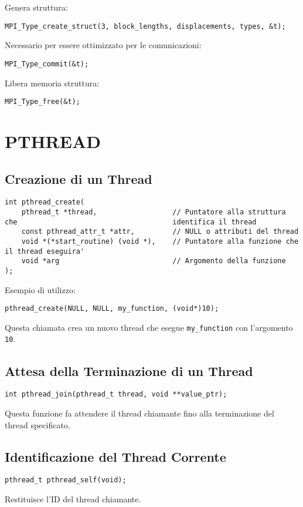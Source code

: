 \documentclass[a4paper,12pt]{article}
\begin{document}
Genera struttura:
\begin{verbatim}
MPI_Type_create_struct(3, block_lengths, displacements, types, &t);
\end{verbatim}

Necessario per essere ottimizzato per le comunicazioni:
\begin{verbatim}
MPI_Type_commit(&t);
\end{verbatim}

Libera memoria struttura:
\begin{verbatim}
MPI_Type_free(&t);
\end{verbatim}

\section{PTHREAD}

\subsection{Creazione di un Thread}
\begin{lstlisting}
int pthread_create(
    pthread_t *thread,                  // Puntatore alla struttura che                                     identifica il thread
    const pthread_attr_t *attr,         // NULL o attributi del thread
    void *(*start_routine) (void *),    // Puntatore alla funzione che                                      il thread eseguira'
    void *arg                           // Argomento della funzione
);
\end{lstlisting}
Esempio di utilizzo:
\begin{verbatim}
pthread_create(NULL, NULL, my_function, (void*)10);
\end{verbatim}
Questa chiamata crea un nuovo thread che esegue \texttt{my\_function} con l'argomento \texttt{10}.

\subsection{Attesa della Terminazione di un Thread}
\begin{verbatim}
int pthread_join(pthread_t thread, void **value_ptr);
\end{verbatim}
Questa funzione fa attendere il thread chiamante fino alla terminazione del thread specificato.

\subsection{Identificazione del Thread Corrente}
\begin{verbatim}
pthread_t pthread_self(void);
\end{verbatim}
Restituisce l'ID del thread chiamante.
\end{document}
